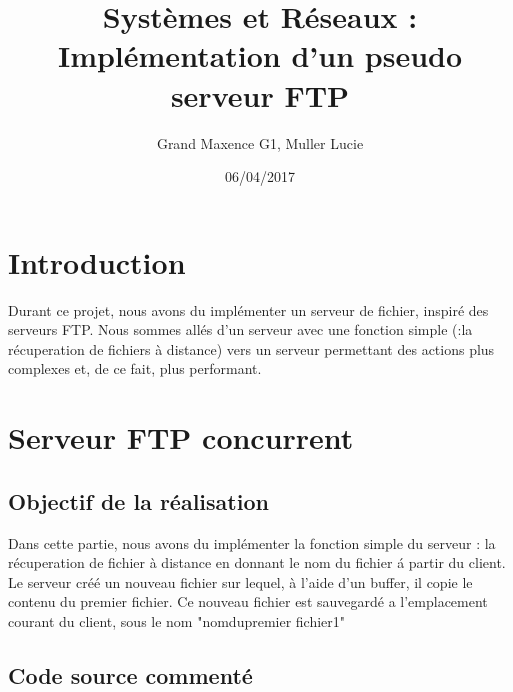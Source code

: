 \documentclass{report}
\author{Grand Maxence G1, Muller Lucie}
\title{Syst\`emes et R\'eseaux : Impl\'ementation d'un pseudo serveur FTP }
\date{06/04/2017}
\begin{document}
\maketitle
\tableofcontents

\chapter*{Introduction}
	Durant ce projet, nous avons du impl\'ementer un serveur de fichier, inspir\'e des serveurs FTP. Nous sommes all\'es d'un serveur avec une fonction simple (:la r\'ecuperation de fichiers \`a distance) vers un serveur permettant des actions plus complexes et, de ce fait, plus performant.\\
    \chapter{Serveur FTP concurrent}
      \section{Objectif de la r\'ealisation}
	Dans cette partie, nous avons du impl\'ementer la fonction simple du serveur : la r\'ecuperation de fichier \`a distance en donnant le nom du fichier \'a partir du client. Le serveur cr\'e\'e un nouveau fichier sur lequel, \`a l'aide d'un buffer, il copie le contenu du premier fichier. Ce nouveau fichier est sauvegard\'e a l'emplacement courant du client, sous le nom "nomdupremier fichier1"\\
      \section{Code source comment\'e}
\end{document}
